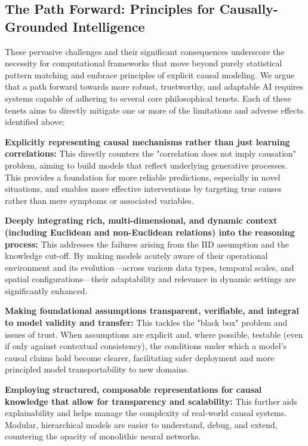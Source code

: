 \newpage

\subsection{The Path Forward: Principles for Causally-Grounded Intelligence}
\label{subsec:path_forward_principles}

These pervasive challenges and their significant consequences underscore the necessity for computational frameworks that move beyond purely statistical pattern matching and embrace principles of explicit causal modeling. We argue that a path forward towards more robust, trustworthy, and adaptable AI requires systems capable of adhering to several core philosophical tenets. Each of these tenets aims to directly mitigate one or more of the limitations and adverse effects identified above:

\textbf{Explicitly representing causal mechanisms rather than just learning correlations:} This directly counters the "correlation does not imply causation" problem, aiming to build models that reflect underlying generative processes. This provides a foundation for more reliable predictions, especially in novel situations, and enables more effective interventions by targeting true causes rather than mere symptoms or associated variables.

     \textbf{Deeply integrating rich, multi-dimensional, and dynamic context (including Euclidean and non-Euclidean relations) into the reasoning process:} This addresses the failures arising from the IID assumption and the knowledge cut-off. By making models acutely aware of their operational environment and its evolution—across various data types, temporal scales, and spatial configurations—their adaptability and relevance in dynamic settings are significantly enhanced.

    \textbf{Making foundational assumptions transparent, verifiable, and integral to model validity and transfer:} This tackles the "black box" problem and issues of trust. When assumptions are explicit and, where possible, testable (even if only against contextual consistency), the conditions under which a model's causal claims hold become clearer, facilitating safer deployment and more principled model transportability to new domains.

    \textbf{Employing structured, composable representations for causal knowledge that allow for transparency and scalability:} This further aids explainability and helps manage the complexity of real-world causal systems. Modular, hierarchical models are easier to understand, debug, and extend, countering the opacity of monolithic neural networks.

